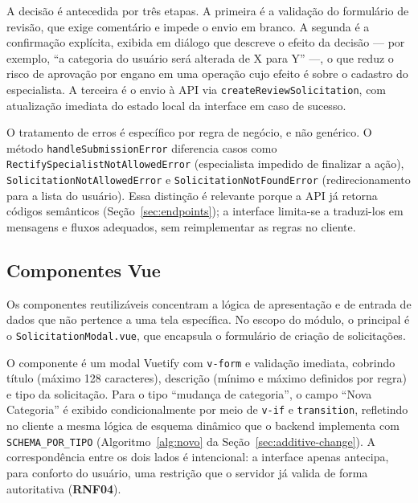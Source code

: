 
A decisão é antecedida por três etapas. A primeira é a validação do formulário de revisão, que
exige comentário e impede o envio em branco. A segunda é a confirmação explícita, exibida em
diálogo que descreve o efeito da decisão --- por exemplo, ``a categoria do usuário será alterada
de X para Y'' ---, o que reduz o risco de aprovação por engano em uma operação cujo efeito é
sobre o cadastro do especialista. A terceira é o envio à API via
\texttt{createReviewSolicitation}, com atualização imediata do estado local da interface em caso
de sucesso.

O tratamento de erros é específico por regra de negócio, e não genérico. O método
\texttt{handleSubmissionError} diferencia casos como \texttt{RectifySpecialistNotAllowedError}
(especialista impedido de finalizar a ação), \texttt{SolicitationNotAllowedError} e
\texttt{SolicitationNotFoundError} (redirecionamento para a lista do usuário). Essa distinção é
relevante porque a API já retorna códigos semânticos (Seção~\ref{sec:endpoints}); a interface limita-se a
traduzi-los em mensagens e fluxos adequados, sem reimplementar as regras no cliente.

\subsection{Componentes Vue}
\label{subsec:componentes-vue}
Os componentes reutilizáveis concentram a lógica de apresentação e de entrada de dados que não
pertence a uma tela específica. No escopo do módulo, o principal é o
\texttt{SolicitationModal.vue}, que encapsula o formulário de criação de solicitações.

O componente é um modal Vuetify com \texttt{v-form} e validação imediata, cobrindo
título (máximo 128 caracteres), descrição (mínimo e máximo definidos por regra) e tipo
da solicitação. Para o tipo ``mudança de categoria'', o campo ``Nova Categoria'' é
exibido condicionalmente por meio de \texttt{v-if} e \texttt{transition}, refletindo no
cliente a mesma lógica de esquema dinâmico que o backend implementa com
\texttt{SCHEMA\_POR\_TIPO} (Algoritmo~\ref{alg:novo} da Seção~\ref{sec:additive-change}). A correspondência entre os dois
lados é intencional: a interface apenas antecipa, para conforto do usuário, uma
restrição que o servidor já valida de forma autoritativa (\textbf{RNF04}).

